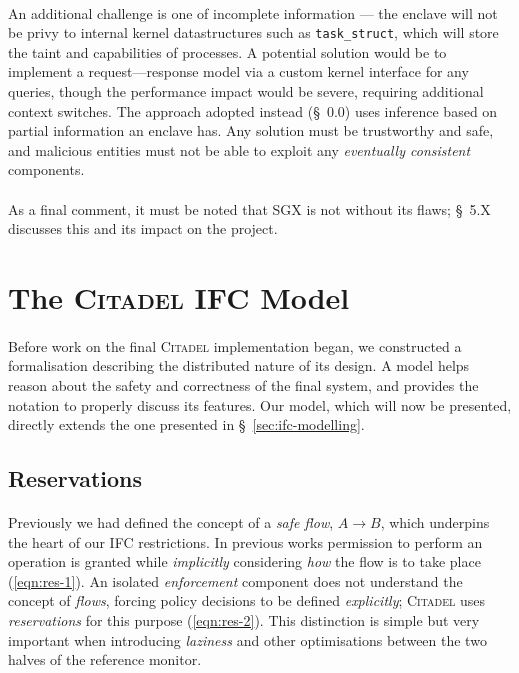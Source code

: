 \paragraph{} An additional challenge is one of incomplete information --- the enclave will not be privy to internal kernel datastructures such as \texttt{task\_struct}, which will store the taint and capabilities of processes. A potential solution would be to implement a request---response model via a custom kernel interface for any queries, though the performance impact would be severe, requiring additional context switches. The approach adopted instead (§~0.0) uses inference based on partial information an enclave has. Any solution must be trustworthy and safe, and malicious entities must not be able to exploit any \textit{eventually consistent} components.~\cite{10.1145/1435417.1435432}

\paragraph{} As a final comment, it must be noted that SGX is not without its flaws; §~5.X discusses this and its impact on the project.



\section{The \textsc{Citadel} IFC Model}

\paragraph{} Before work on the final \textsc{Citadel} implementation began, we constructed a formalisation describing the distributed nature of its design. A model helps reason about the safety and correctness of the final system, and provides the notation to properly discuss its features. Our model, which will now be presented, directly extends the one presented in §~\ref{sec:ifc-modelling}.

\subsection{Reservations}

\paragraph{} Previously we had defined the concept of a \textit{safe flow}, $A \rightarrow B$, which underpins the heart of our IFC restrictions. In previous works permission to perform an operation is granted while \textit{implicitly} considering \textit{how} the flow is to take place (\ref{eqn:res-1}). An isolated \textit{enforcement} component does not understand the concept of \textit{flows}, forcing policy decisions to be defined \textit{explicitly}; \textsc{Citadel} uses \textit{reservations} for this purpose (\ref{eqn:res-2}). This distinction is simple but very important when introducing \textit{laziness} and other optimisations between the two halves of the reference monitor.

